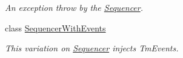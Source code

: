 \begin{DoxyCompactItemize}
\begin{DoxyCompactList}\small\item\em An exception throw by the \hyperlink{classstrange_1_1extensions_1_1sequencer_1_1impl_1_1_sequencer}{Sequencer}. \end{DoxyCompactList}\item 
class \hyperlink{classstrange_1_1extensions_1_1sequencer_1_1impl_1_1_sequencer_with_events}{Sequencer\-With\-Events}
\begin{DoxyCompactList}\small\item\em This variation on \hyperlink{classstrange_1_1extensions_1_1sequencer_1_1impl_1_1_sequencer}{Sequencer} injects Tm\-Events. \end{DoxyCompactList}\end{DoxyCompactItemize}

